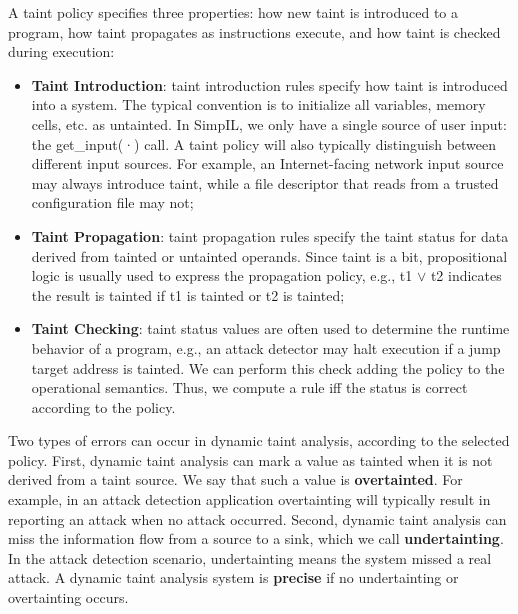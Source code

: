 A taint policy specifies three properties: how new taint is introduced to a program, how taint propagates as instructions execute, and how taint is checked during execution:
\begin{itemize}
	\item \textbf{Taint Introduction}: taint introduction rules specify how taint is introduced into a system. The typical convention is to initialize all variables, memory cells, etc. as untainted. In SimpIL, we only have a single source of user input: the get\_input(·) call. A taint policy will also typically distinguish between different input sources. For example, an Internet-facing network input source may always introduce taint, while a file descriptor that reads from a trusted configuration file may not;
	\item \textbf{Taint Propagation}: taint propagation rules specify the taint status for data derived from tainted or untainted operands. Since taint is a bit, propositional logic is usually used to express the propagation policy, e.g., t1 $\lor$ t2 indicates the result is tainted if t1 is tainted or t2 is tainted;
	\item \textbf{Taint Checking}: taint status values are often used to determine the runtime behavior of a program, e.g., an attack detector may halt execution if a jump target address is tainted. We can perform this check adding the policy to the operational semantics. Thus, we compute a rule iff the status is correct according to the policy.
\end{itemize}

Two types of errors can occur in dynamic taint analysis, according to the selected policy. First, dynamic taint analysis can mark a value as tainted when it is not derived from a taint source. We say that such a value is \textbf{overtainted}. For example, in an attack detection application overtainting will typically result in reporting an attack when no attack occurred. Second, dynamic taint analysis can miss the information flow from a source to a sink, which we call \textbf{undertainting}. In the attack detection scenario, undertainting means the system missed a real attack. A dynamic taint analysis system is \textbf{precise} if no undertainting or overtainting occurs.
